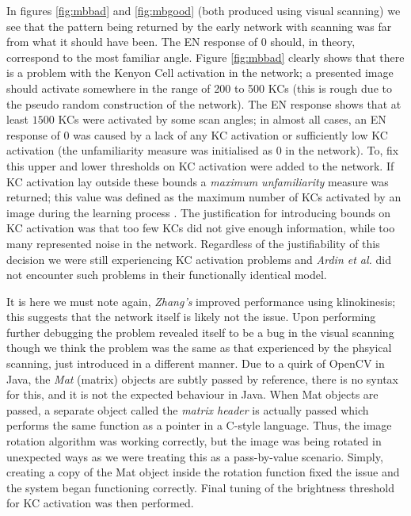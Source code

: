 \documentclass[a4paper,11pt,twoside,openright]{article}
\begin{document}
In figures \ref{fig:mbbad} and \ref{fig:mbgood} (both produced using visual scanning) we see that the pattern being
returned by the early network with scanning was far from what it should have been. The EN response of 0 should, in theory,
correspond to the most familiar angle. Figure \ref{fig:mbbad} clearly shows that there is a problem with the Kenyon Cell
activation in the network; a presented image should activate somewhere in the range of 200 to 500 KCs (this is rough due
to the pseudo random construction of the network). The EN response shows that at least $1500$ KCs were activated by some
scan angles; in almost all cases, an EN response of $0$ was caused by a lack of any KC activation or sufficiently
low KC activation (the unfamiliarity measure
was initialised as $0$ in the network). To, fix this upper and lower thresholds on KC activation were added to the
network. If KC activation lay outside these bounds a \textit{maximum unfamiliarity} measure was returned; this value
was defined as the maximum number of KCs activated by an image during the learning process \cite{Zhang2017}. The justification for introducing
bounds on KC activation was that too few KCs did not give enough information, while too many represented noise in the network.
Regardless of the justifiability of this decision we were still experiencing KC activation problems and \textit{Ardin et al.}
did not encounter such problems in their functionally identical model.
\newline

It is here we must note again, \textit{Zhang's} improved performance using klinokinesis; this suggests that the network itself
is likely not the issue. Upon performing further debugging
the problem revealed itself to be a bug in the visual scanning though we think the problem was the same as that experienced by the
phsyical scanning, just introduced in a different manner. Due to a quirk of OpenCV in Java, the \textit{Mat} (matrix) objects are subtly passed by reference, there is no
syntax for this, and it is not the expected behaviour in Java. When Mat objects are passed,
a separate object called the \textit{matrix header} is actually passed which performs the same function as a pointer in a C-style
language. Thus, the image rotation algorithm was working correctly, but the image was being rotated in unexpected ways as we were
treating this as a pass-by-value scenario. Simply, creating a copy of the Mat object inside the rotation function fixed the issue
and the system began functioning correctly. Final tuning of the brightness threshold for KC activation was then performed.
\newline
\end{document}
